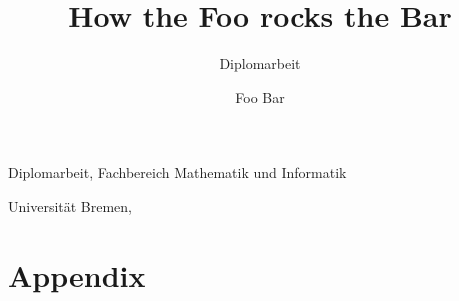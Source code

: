 \documentclass{thesis}
\author{Foo Bar}
\title{How the Foo rocks the Bar}
\subtitle{Diplomarbeit}
\begin{document}
\maketitle

\clearpage
\thispagestyle{empty}\small
\null\vfill

\makeatletter
  \textbf{\@author}\par
  \@title\par
  \ifthesis@hassubtitle\@subtitleshort\fi

  Diplomarbeit, Fachbereich Mathematik und Informatik\par
  Universität Bremen, \monthyear
\makeatother

\normalsize

\clearpage


\frontmatter
{}
{}
\tableofcontents


\cleardoublepage



\mainmatter


%
%

\appendix
\chapter{Appendix}

\end{document}
